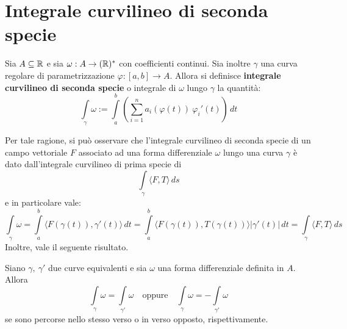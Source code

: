 \section{Integrale curvilineo di seconda specie}
\begin{definition} \label{Def: Integrale curvilineo di seconda specie}
    Sia $A \subseteq \mathbb{R}$ e sia $\omega: A \to (\mathbb{R})^*$ con coefficienti continui. Sia inoltre $\gamma$ una curva regolare di parametrizzazione $\varphi: [a, b] \to A$. Allora si definisce \textbf{integrale curvilineo di seconda specie} o integrale di $\omega$ lungo $\gamma$ la quantità:
    \begin{equation} \label{Eq: Integrale curvilineo di seconda specie}
        \int\limits_\gamma \omega := \int\limits_{a}^{b}\left( \sum\limits_{i=1}^{n}{a_i(\varphi(t))\ \varphi_i'(t)}\right)\, dt
    \end{equation}
\end{definition}
Per tale ragione, si può osservare che l'integrale curvilineo di seconda specie di un campo vettoriale $F$ associato ad una forma differenziale $\omega$ lungo una curva $\gamma$ è dato dall'integrale curvilineo di prima specie di 
\begin{equation}
    \int\limits_{\gamma}{\langle F, T \rangle}\, ds
\end{equation}
e in particolare vale:
\begin{equation}
    \int\limits_{\gamma}{\omega}= \int\limits_{a}^{b} {\langle F(\gamma(t)), \gamma'(t)\rangle}\, dt = \int\limits_{a}^{b} {\langle F(\gamma(t)), T(\gamma(t))\rangle} |\gamma'(t)|\, dt = \int\limits_{\gamma}{\langle F, T \rangle}\, ds
\end{equation}
Inoltre, vale il seguente risultato.
\begin{theorem} \label{Teo: Invarianza per equivalenza di curve dell'integrale curv di 2 specie}
    Siano $\gamma,\ \gamma'$ due curve equivalenti e sia $\omega$ una forma differenziale definita in $A$. Allora
    \begin{equation}
        \int\limits_\gamma { \omega} = \int\limits_{\gamma'}{\omega}\quad \text{oppure} \quad \int\limits_\gamma { \omega} = -\int\limits_{\gamma'}{\omega}
    \end{equation}
    se sono percorse nello stesso verso o in verso opposto, rispettivamente.
\end{theorem}
